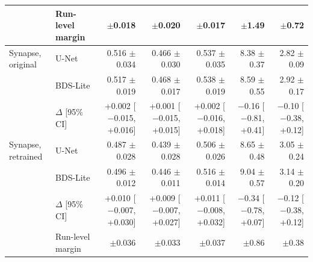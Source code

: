 \begin{tabular}{llrrrrr}
\addlinespace
 & Run-level margin & $\pm$0.018 & $\pm$0.020 & $\pm$0.017 & $\pm$1.49 & $\pm$0.72 \\
\midrule
Synapse, original & U-Net & 0.516 $\pm$ 0.034 & 0.466 $\pm$ 0.030 & 0.537 $\pm$ 0.035 & 8.38 $\pm$ 0.37 & 2.82 $\pm$ 0.09 \\
 & BDS-Lite & 0.517 $\pm$ 0.019 & 0.468 $\pm$ 0.017 & 0.538 $\pm$ 0.019 & 8.59 $\pm$ 0.55 & 2.92 $\pm$ 0.17 \\
 & $\Delta$ [95\% CI] & +0.002 [$-$0.015, +0.016] & +0.001 [$-$0.015, +0.015] & +0.002 [$-$0.016, +0.018] & $-$0.16 [$-$0.81, +0.41] & $-$0.10 [$-$0.38, +0.12] \\
\addlinespace
Synapse, retrained & U-Net & 0.487 $\pm$ 0.028 & 0.439 $\pm$ 0.028 & 0.506 $\pm$ 0.026 & 8.65 $\pm$ 0.48 & 3.05 $\pm$ 0.24 \\
 & BDS-Lite & 0.496 $\pm$ 0.012 & 0.446 $\pm$ 0.011 & 0.516 $\pm$ 0.014 & 9.04 $\pm$ 0.57 & 3.14 $\pm$ 0.20 \\
 & $\Delta$ [95\% CI] & +0.010 [$-$0.007, +0.030] & +0.009 [$-$0.007, +0.027] & +0.011 [$-$0.008, +0.032] & $-$0.34 [$-$0.78, +0.07] & $-$0.12 [$-$0.38, +0.12] \\
\addlinespace
 & Run-level margin & $\pm$0.036 & $\pm$0.033 & $\pm$0.037 & $\pm$0.86 & $\pm$0.38 \\
\bottomrule
\end{tabular}
